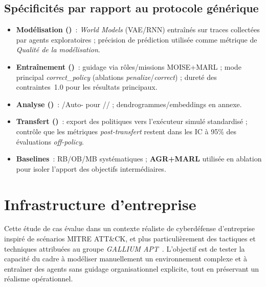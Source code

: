 \subsection{Spécificités par rapport au protocole générique}
\label{subsec:non_cyber_specifics}
\begin{itemize}
  \item \textbf{Modélisation ()}~: \textit{World Models} (VAE/RNN) entraînés sur traces collectées par agents exploratoires ; précision de prédiction utilisée comme métrique de \emph{Qualité de la modélisation}.
  \item \textbf{Entraînement ()}~: guidage via rôles/missions MOISE+MARL ; mode principal \textit{correct\_policy} (ablations \textit{penalize}/\textit{correct}) ; dureté des contraintes~1.0 pour les résultats principaux.
  \item \textbf{Analyse ()}~: /Auto- pour // ; dendrogrammes/embeddings en annexe.
  \item \textbf{Transfert ()}~: export des politiques vers l’exécuteur simulé standardisé ; contrôle que les métriques \emph{post-transfert} restent dans les IC à 95\% des évaluations \emph{off-policy}.
  \item \textbf{Baselines}~: RB/OB/MB systématiques ; \textbf{AGR+MARL} utilisée en ablation pour isoler l’apport des objectifs intermédiaires.
\end{itemize}


\section{Infrastructure d’entreprise}
\label{sec:enterprise_infra}

Cette étude de cas évalue  dans un contexte réaliste de cyberdéfense d’entreprise inspiré de scénarios MITRE ATT\&CK, et plus particulièrement des tactiques et techniques attribuées au groupe \textit{GALLIUM APT}~\cite{MITREATTACKWebiste}.
L’objectif est de tester la capacité du cadre à modéliser manuellement un environnement complexe et à entraîner des agents sans guidage organisationnel explicite, tout en préservant un réalisme opérationnel.

